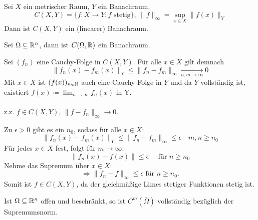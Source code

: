 \begin{prop}
	Sei $X$ ein metrischer Raum, $Y$ ein Banachraum.
	\[ C(X, Y) = \{ f \colon X \rightarrow Y: f \text{ stetig} \}, ~ \| f \|_{\infty} = \sup_{x \in X} \| f(x) \|_{Y} \]
	Dann ist $C(X, Y)$ ein (linearer) Banachraum.
\end{prop}


\begin{beispiel*}
	Sei $\Omega \subseteq \mathbb{R}^{n}$, dann ist  $C(\Omega, \mathbb{R})$ ein Banachraum.
\end{beispiel*}

\begin{beweis}
	Sei $(f_{n})$ eine Cauchy-Folge in $C(X, Y)$. Für alle $x \in X$ gilt demnach
	\[ \| f_{n}(x) - f_{m}(x) \|_{Y} \leq \| f_{n} - f_{m} \|_{\infty} \xrightarrow[n, m \rightarrow \infty]{} 0 \]
	Mit $x \in X$ ist $(f(x))_{n \in \mathbb{N}}$ auch eine Cauchy-Folge in $Y$ und da $Y$ vollständig ist, existiert $f(x) \coloneqq \lim_{n \rightarrow \infty} f_{n}(x)$ in Y. \\ \\
	z.z. $f \in C(X, Y)$, $\| f - f_{n} \|_{\infty} \rightarrow 0$.
	
	Zu $\epsilon > 0$ gibt es ein $n_{0}$, sodass für alle $x \in X$:
		\[ \| f_{n}(x) - f_{m}(x) \|_{Y} \leq \| f_{n} - f_{m} \|_{\infty} \leq \epsilon \quad m, n \geq n_{0} \]
	Für jedes $x \in X$ fest, folgt für $m \rightarrow \infty$:
		\[ \| f_{n}(x) - f(x) \| \leq \epsilon \quad \text{ für } n \geq n_{0} \]
	Nehme das Supremum über $x \in X$:
		\[ \Rightarrow \| f_{n} - f \|_{\infty} \leq \epsilon \text{ für } n \geq n_{0}. 	\]
	Somit ist $f \in C(X, Y)$, da der gleichmä{\ss}ige Limes stetiger Funktionen stetig ist.
\end{beweis}


\begin{beispiel}
	Ist $\Omega \subseteq \mathbb{R}^{n}$ offen und beschränkt, so ist $C^{m}(\bar \Omega)$ vollständig bezüglich der Supremumsnorm.	
\end{beispiel}

